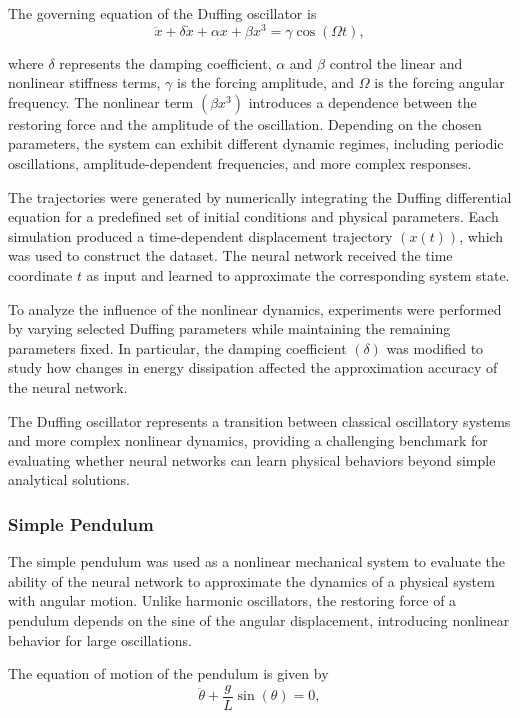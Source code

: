 The governing equation of the Duffing oscillator is
\begin{equation}
    \ddot{x}+\delta\dot{x}+\alpha x+\beta x^3=\gamma\cos(\Omega t),
    \label{eq:duffing_oscillator}
\end{equation}

where $\delta$ represents the damping coefficient, $\alpha$ and $\beta$ control the linear and nonlinear stiffness terms, $\gamma$ is the forcing amplitude, and $\Omega$ is the forcing angular frequency.
The nonlinear term $ (\beta x^3) $ introduces a dependence between the restoring force and the amplitude of the oscillation. Depending on the chosen parameters, the system can exhibit different dynamic regimes, including periodic oscillations, amplitude-dependent frequencies, and more complex responses.

The trajectories were generated by numerically integrating the Duffing differential equation for a predefined set of initial conditions and physical parameters. Each simulation produced a time-dependent displacement trajectory $(x(t))$, which was used to construct the dataset. The neural network received the time coordinate $t$ as input and learned to approximate the corresponding system state.

To analyze the influence of the nonlinear dynamics, experiments were performed by varying selected Duffing parameters while maintaining the remaining parameters fixed. In particular, the damping coefficient $(\delta)$ was modified to study how changes in energy dissipation affected the approximation accuracy of the neural network.

The Duffing oscillator represents a transition between classical oscillatory systems and more complex nonlinear dynamics, providing a challenging benchmark for evaluating whether neural networks can learn physical behaviors beyond simple analytical solutions.

\subsubsection{Simple Pendulum}
The simple pendulum was used as a nonlinear mechanical system to evaluate the ability of the neural network to approximate the dynamics of a physical system with angular motion. Unlike harmonic oscillators, the restoring force of a pendulum depends on the sine of the angular displacement, introducing nonlinear behavior for large oscillations.

The equation of motion of the pendulum is given by
\begin{equation}
    \ddot{\theta}+\frac{g}{L}\sin(\theta)=0,
    \label{eq:simple_pendulum}
\end{equation}

